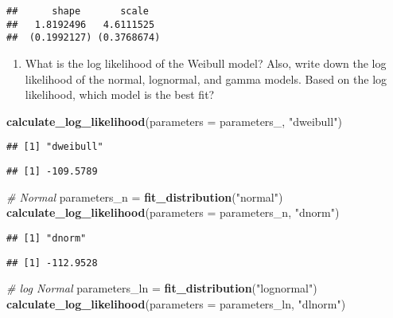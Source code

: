 \documentclass[
]{article}
\newenvironment{Shaded}{\begin{snugshade}}{\end{snugshade}}
\newcommand{\CommentTok}[1]{\textcolor[rgb]{0.56,0.35,0.01}{\textit{#1}}}
\newcommand{\DataTypeTok}[1]{\textcolor[rgb]{0.13,0.29,0.53}{#1}}
\newcommand{\KeywordTok}[1]{\textcolor[rgb]{0.13,0.29,0.53}{\textbf{#1}}}
\newcommand{\NormalTok}[1]{#1}
\newcommand{\StringTok}[1]{\textcolor[rgb]{0.31,0.60,0.02}{#1}}
\providecommand{\tightlist}{%
  \setlength{\itemsep}{0pt}\setlength{\parskip}{0pt}}
\begin{document}
\begin{verbatim}
##      shape       scale  
##   1.8192496   4.6111525 
##  (0.1992127) (0.3768674)
\end{verbatim}

\begin{enumerate}
\def\labelenumi{(\arabic{enumi})}
\setcounter{enumi}{1}
\tightlist
\item
  What is the log likelihood of the Weibull model? Also, write down the
  log likelihood of the normal, lognormal, and gamma models. Based on
  the log likelihood, which model is the best fit?
\end{enumerate}

\begin{Shaded}
\begin{Highlighting}[]
\KeywordTok{calculate_log_likelihood}\NormalTok{(}\DataTypeTok{parameters =}\NormalTok{ parameters_, }\StringTok{"dweibull"}\NormalTok{)}
\end{Highlighting}
\end{Shaded}

\begin{verbatim}
## [1] "dweibull"
\end{verbatim}

\begin{verbatim}
## [1] -109.5789
\end{verbatim}

\begin{Shaded}
\begin{Highlighting}[]
\CommentTok{# Normal }
\NormalTok{parameters_n =}\StringTok{ }\KeywordTok{fit_distribution}\NormalTok{(}\StringTok{"normal"}\NormalTok{)}
\KeywordTok{calculate_log_likelihood}\NormalTok{(}\DataTypeTok{parameters =}\NormalTok{ parameters_n, }\StringTok{"dnorm"}\NormalTok{)}
\end{Highlighting}
\end{Shaded}

\begin{verbatim}
## [1] "dnorm"
\end{verbatim}

\begin{verbatim}
## [1] -112.9528
\end{verbatim}

\begin{Shaded}
\begin{Highlighting}[]
\CommentTok{# log Normal }
\NormalTok{parameters_ln =}\StringTok{ }\KeywordTok{fit_distribution}\NormalTok{(}\StringTok{"lognormal"}\NormalTok{)}
\KeywordTok{calculate_log_likelihood}\NormalTok{(}\DataTypeTok{parameters =}\NormalTok{ parameters_ln, }\StringTok{"dlnorm"}\NormalTok{)}
\end{Highlighting}
\end{Shaded}
\end{document}
